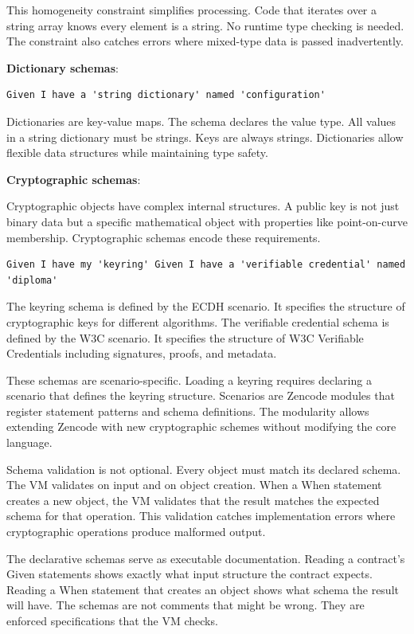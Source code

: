 This homogeneity constraint simplifies processing. Code that iterates
over a string array knows every element is a string. No runtime type
checking is needed. The constraint also catches errors where
mixed-type data is passed inadvertently.

\textbf{Dictionary schemas}:

\begin{verbatim}
Given I have a 'string dictionary' named 'configuration'
\end{verbatim}

Dictionaries are key-value maps. The schema declares the value
type. All values in a string dictionary must be strings. Keys are
always strings. Dictionaries allow flexible data structures while
maintaining type safety.

\textbf{Cryptographic schemas}:

Cryptographic objects have complex internal structures. A public key
is not just binary data but a specific mathematical object with
properties like point-on-curve membership. Cryptographic schemas
encode these requirements.

\begin{verbatim}
Given I have my 'keyring' Given I have a 'verifiable credential' named
'diploma'
\end{verbatim}

The keyring schema is defined by the ECDH scenario. It specifies the
structure of cryptographic keys for different algorithms. The
verifiable credential schema is defined by the W3C scenario. It
specifies the structure of W3C Verifiable Credentials including
signatures, proofs, and metadata.

These schemas are scenario-specific. Loading a keyring requires
declaring a scenario that defines the keyring structure. Scenarios are
Zencode modules that register statement patterns and schema
definitions. The modularity allows extending Zencode with new
cryptographic schemes without modifying the core language.

Schema validation is not optional. Every object must match its
declared schema. The VM validates on input and on object
creation. When a When statement creates a new object, the VM validates
that the result matches the expected schema for that operation. This
validation catches implementation errors where cryptographic
operations produce malformed output.

The declarative schemas serve as executable documentation. Reading a
contract's Given statements shows exactly what input structure the
contract expects. Reading a When statement that creates an object
shows what schema the result will have. The schemas are not comments
that might be wrong. They are enforced specifications that the VM
checks.


